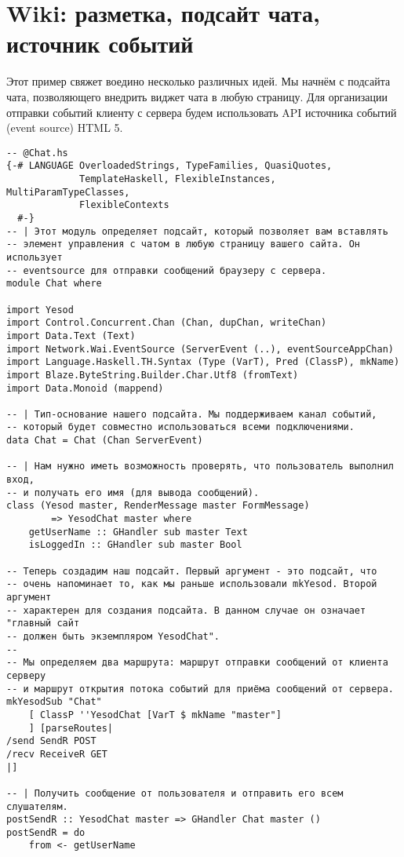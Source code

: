\chapter{Wiki: разметка, подсайт чата, источник событий}
\label{}

Этот пример свяжет воедино несколько различных идей. Мы начнём с подсайта чата, позволяющего внедрить виджет чата в любую страницу. Для организации отправки событий клиенту с сервера будем использовать API источника событий (event source) HTML 5.

\begin{lstlisting}
-- @Chat.hs
{-# LANGUAGE OverloadedStrings, TypeFamilies, QuasiQuotes,
             TemplateHaskell, FlexibleInstances, MultiParamTypeClasses,
             FlexibleContexts
  #-}
-- | Этот модуль определяет подсайт, который позволяет вам вставлять
-- элемент управления с чатом в любую страницу вашего сайта. Он использует
-- eventsource для отправки сообщений браузеру с сервера.
module Chat where

import Yesod
import Control.Concurrent.Chan (Chan, dupChan, writeChan)
import Data.Text (Text)
import Network.Wai.EventSource (ServerEvent (..), eventSourceAppChan)
import Language.Haskell.TH.Syntax (Type (VarT), Pred (ClassP), mkName)
import Blaze.ByteString.Builder.Char.Utf8 (fromText)
import Data.Monoid (mappend)

-- | Тип-основание нашего подсайта. Мы поддерживаем канал событий,
-- который будет совместно использоваться всеми подключениями.
data Chat = Chat (Chan ServerEvent)

-- | Нам нужно иметь возможность проверять, что пользователь выполнил вход,
-- и получать его имя (для вывода сообщений).
class (Yesod master, RenderMessage master FormMessage)
        => YesodChat master where
    getUserName :: GHandler sub master Text
    isLoggedIn :: GHandler sub master Bool

-- Теперь создадим наш подсайт. Первый аргумент - это подсайт, что
-- очень напоминает то, как мы раньше использовали mkYesod. Второй аргумент
-- характерен для создания подсайта. В данном случае он означает "главный сайт
-- должен быть экземпляром YesodChat".
--
-- Мы определяем два маршрута: маршрут отправки сообщений от клиента серверу
-- и маршрут открытия потока событий для приёма сообщений от сервера.
mkYesodSub "Chat"
    [ ClassP ''YesodChat [VarT $ mkName "master"]
    ] [parseRoutes|
/send SendR POST
/recv ReceiveR GET
|]

-- | Получить сообщение от пользователя и отправить его всем слушателям.
postSendR :: YesodChat master => GHandler Chat master ()
postSendR = do
    from <- getUserName


\end{lstlisting}
